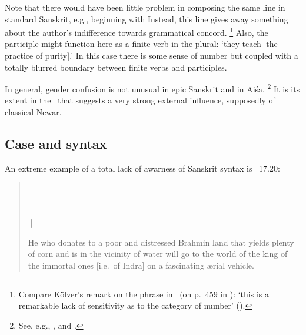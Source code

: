 \noindent
Note that there would have been little problem in composing the same
line in standard Sanskrit, e.g., beginning with 
Instead, this line gives away something about the author's indifference
towards grammatical concord.%
		\footnote{Compare Kölver's remark on the phrase 
		in \SvayP\ (on p.~459 in ):
		`this is a remarkable lack of sensitivity as to the category of number'
		().}
Also, the participle  might
function here as a finite verb in the plural: `they teach [the practice of purity].'
In this case there is some sense of number but coupled with a totally 
blurred boundary between finite verbs and participles.


In general, gender confusion is not unusual in epic Sanskrit and in Aiśa.%
		\footnote{See, e.g., , and
									.}
It is its extent in the \VSS\ that suggests a very strong external influence,
supposedly of classical Newar.									





\subsection{Case and syntax}

An extreme example of a total lack of awarness of Sanskrit syntax is
\VSS~17.20:

\begin{quote}
\\
 |\\
\\
 ||

        He who donates to a poor and distressed Brahmin land 
        that yields plenty of corn and is in the vicinity of water
        will go to the world of the king of the immortal ones [i.e.\ of Indra]
		 on a fascinating \ae rial vehicle.
\end{quote}            
            
